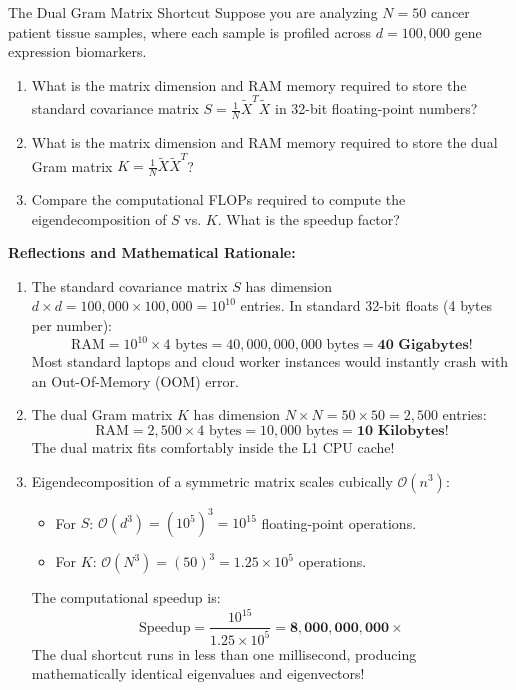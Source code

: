 \begin{ponderbox}{The Dual Gram Matrix Shortcut}
Suppose you are analyzing $N = 50$ cancer patient tissue samples, where each sample is profiled across $d = 100{,}000$ gene expression biomarkers.
\begin{enumerate}
    \item What is the matrix dimension and RAM memory required to store the standard covariance matrix $S = \frac{1}{N}\tilde{X}^T \tilde{X}$ in 32-bit floating-point numbers?
    \item What is the matrix dimension and RAM memory required to store the dual Gram matrix $K = \frac{1}{N}\tilde{X}\tilde{X}^T$?
    \item Compare the computational FLOPs required to compute the eigendecomposition of $S$ vs. $K$. What is the speedup factor?
\end{enumerate}
\tcblower
\textbf{Reflections and Mathematical Rationale:}
\begin{enumerate}
    \item The standard covariance matrix $S$ has dimension $d \times d = 100{,}000 \times 100{,}000 = 10^{10}$ entries. In standard 32-bit floats (4 bytes per number):
    \begin{equation*}
    \text{RAM} = 10^{10} \times 4 \text{ bytes} = 40{,}000{,}000{,}000 \text{ bytes} = \mathbf{40 \text{ Gigabytes!}}
    \end{equation*}
    Most standard laptops and cloud worker instances would instantly crash with an Out-Of-Memory (OOM) error.
    \item The dual Gram matrix $K$ has dimension $N \times N = 50 \times 50 = 2{,}500$ entries:
    \begin{equation*}
    \text{RAM} = 2{,}500 \times 4 \text{ bytes} = 10{,}000 \text{ bytes} = \mathbf{10 \text{ Kilobytes!}}
    \end{equation*}
    The dual matrix fits comfortably inside the L1 CPU cache!
    \item Eigendecomposition of a symmetric matrix scales cubically $\mathcal{O}(n^3)$:
    \begin{itemize}
        \item For $S$: $\mathcal{O}(d^3) = (10^5)^3 = 10^{15}$ floating-point operations.
        \item For $K$: $\mathcal{O}(N^3) = (50)^3 = 1.25 \times 10^5$ operations.
    \end{itemize}
    The computational speedup is:
    \begin{equation*}
    \text{Speedup} = \frac{10^{15}}{1.25 \times 10^5} = \mathbf{8{,}000{,}000{,}000 \times}
    \end{equation*}
    The dual shortcut runs in less than one millisecond, producing mathematically identical eigenvalues and eigenvectors!
\end{enumerate}
\end{ponderbox}

